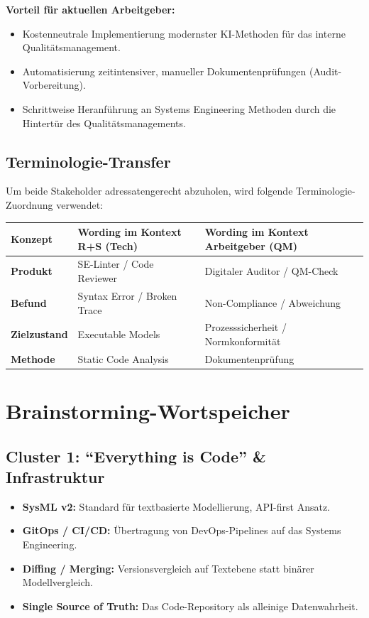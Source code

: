 \documentclass[a4paper,11pt]{article}
\begin{document}
\textbf{Vorteil für aktuellen Arbeitgeber:}
\begin{itemize}
    \item Kostenneutrale Implementierung modernster KI-Methoden für das interne Qualitätsmanagement.
    \item Automatisierung zeitintensiver, manueller Dokumentenprüfungen (Audit-Vorbereitung).
    \item Schrittweise Heranführung an Systems Engineering Methoden durch die Hintertür des Qualitätsmanagements.
\end{itemize}

\subsection*{Terminologie-Transfer}
Um beide Stakeholder adressatengerecht abzuholen, wird folgende Terminologie-Zuordnung verwendet:

\begin{center}
\begin{tabularx}{\textwidth}{|X|X|X|}
\hline
\textbf{Konzept} & \textbf{Wording im Kontext R+S (Tech)} & \textbf{Wording im Kontext Arbeitgeber (QM)} \\
\hline
\textbf{Produkt} & SE-Linter / Code Reviewer & Digitaler Auditor / QM-Check \\
\hline
\textbf{Befund} & Syntax Error / Broken Trace & Non-Compliance / Abweichung \\
\hline
\textbf{Zielzustand} & Executable Models & Prozesssicherheit / Normkonformität \\
\hline
\textbf{Methode} & Static Code Analysis & Dokumentenprüfung \\
\hline
\end{tabularx}
\end{center}

\newpage

\section{Brainstorming-Wortspeicher}

\subsection*{Cluster 1: \enquote{Everything is Code} \& Infrastruktur}
\begin{itemize}[label=$\bullet$, nosep]
    \item \textbf{SysML v2:} Standard für textbasierte Modellierung, API-first Ansatz.
    \item \textbf{GitOps / CI/CD:} Übertragung von DevOps-Pipelines auf das Systems Engineering.
    \item \textbf{Diffing / Merging:} Versionsvergleich auf Textebene statt binärer Modellvergleich.
    \item \textbf{Single Source of Truth:} Das Code-Repository als alleinige Datenwahrheit.
\end{itemize}
\end{document}
